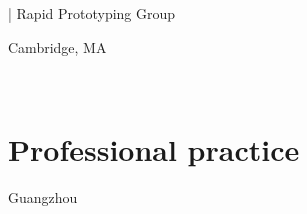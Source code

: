 \documentclass[]{baharmon-cv}
\renewcommand{\baselinestretch}{1.15}
\begin{document}
\begin{minipage}[t]{0.85\textwidth} 
\renewcommand{\baselinestretch}{1.75}
  | Rapid Prototyping Group
\end{minipage}
\begin{minipage}[t]{0.15\textwidth} 
Cambridge, MA
\end{minipage}\\

\sectiondivider


\section{Professional practice}
\begin{minipage}[t]{0.85\textwidth} 
\end{minipage}
\begin{minipage}[t]{0.15\textwidth} 
Guangzhou%
\end{minipage}\\
\clearpage





\end{document}
